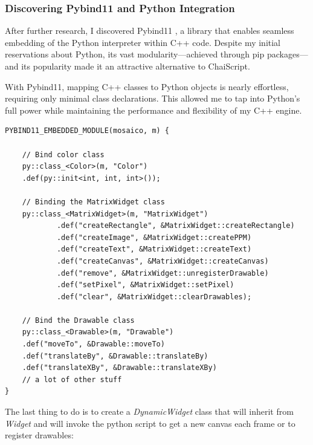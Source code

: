 \subsubsection{Discovering Pybind11 and Python Integration} After further research, I discovered Pybind11 \cite{pybind11}, a library that enables seamless embedding of the Python interpreter within C++ code. Despite my initial reservations about Python, its vast modularity—achieved through pip packages—and its popularity made it an attractive alternative to ChaiScript.

With Pybind11, mapping C++ classes to Python objects is nearly effortless, requiring only minimal class declarations. This allowed me to tap into Python's full power while maintaining the performance and flexibility of my C++ engine.


\begin{verbatim}
PYBIND11_EMBEDDED_MODULE(mosaico, m) {

    // Bind color class
    py::class_<Color>(m, "Color")
    .def(py::init<int, int, int>());

    // Binding the MatrixWidget class
    py::class_<MatrixWidget>(m, "MatrixWidget")
            .def("createRectangle", &MatrixWidget::createRectangle)
            .def("createImage", &MatrixWidget::createPPM)
            .def("createText", &MatrixWidget::createText)
            .def("createCanvas", &MatrixWidget::createCanvas)
            .def("remove", &MatrixWidget::unregisterDrawable)
            .def("setPixel", &MatrixWidget::setPixel)
            .def("clear", &MatrixWidget::clearDrawables);

    // Bind the Drawable class
    py::class_<Drawable>(m, "Drawable")
    .def("moveTo", &Drawable::moveTo)
    .def("translateBy", &Drawable::translateBy)
    .def("translateXBy", &Drawable::translateXBy)
    // a lot of other stuff
}
\end{verbatim}

\newpage

The last thing to do is to create a \textit{DynamicWidget} class that will inherit from \textit{Widget} and will invoke the python script to get a new canvas each frame or to register drawables:

